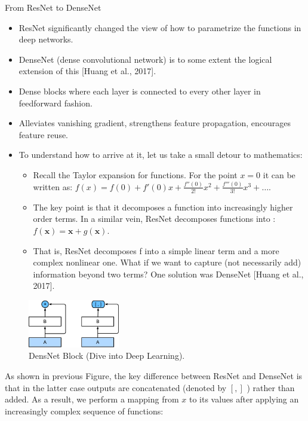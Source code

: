 \begin{vbframe}{From ResNet to DenseNet}
    \begin{itemize}
        \item ResNet significantly changed the view of how to parametrize the functions in deep networks. 
        \item DenseNet (dense convolutional network) is to some extent the logical extension of this [Huang et al., 2017]. 
        \item Dense blocks where each layer is connected to every other layer in feedforward fashion.
        \item Alleviates vanishing gradient, strengthens feature propagation, encourages feature reuse.
        \item To understand how to arrive at it, let us take a small detour to mathematics: 
        \begin{itemize}
             \item Recall the Taylor expansion for functions. For the point  $x=0$  it can be written as: $f(x) = f(0) + f'(0) x + \frac{f''(0)}{2!}  x^2 + \frac{f'''(0)}{3!}  x^3 + \ldots.$
             \item The key point is that it decomposes a function into increasingly higher order terms. In a similar vein, ResNet decomposes functions into : $f(\mathbf{x}) = \mathbf{x} + g(\mathbf{x}).$
             \item That is, ResNet decomposes  f  into a simple linear term and a more complex nonlinear one. What if we want to capture (not necessarily add) information beyond two terms? One solution was DenseNet [Huang et al., 2017].
        \end{itemize}
    \end{itemize}
    
     \begin{figure}
  \centering
    \includegraphics[width=4cm]{plots/moderncnn/densenet-block.png}
    \caption{ DensNet Block (Dive into Deep Learning).}
  \end{figure}
  
\small 
As shown in previous Figure, the key difference between ResNet and DenseNet is that in the latter case outputs are concatenated (denoted by  $[,]$ ) rather than added. As a result, we perform a mapping from  $x$  to its values after applying an increasingly complex sequence of functions:


\end{vbframe}
